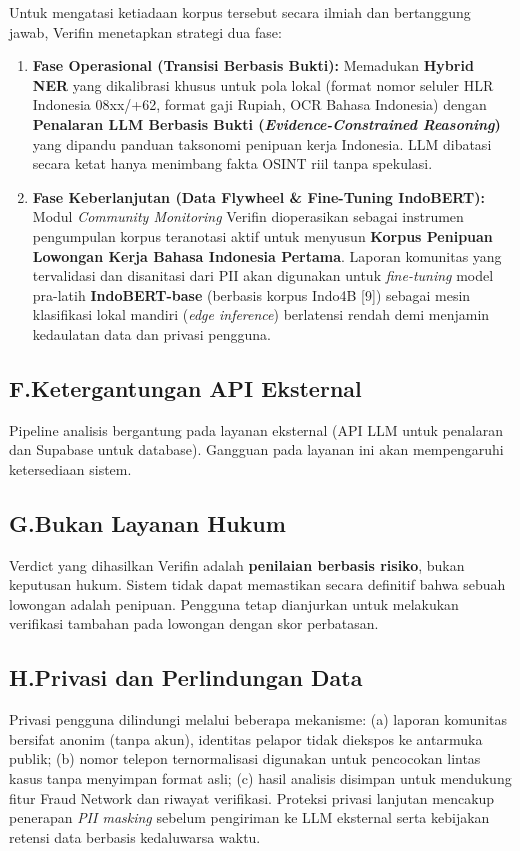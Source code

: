\documentclass[12pt,a4paper]{article}
\begin{document}
Untuk mengatasi ketiadaan korpus tersebut secara ilmiah dan bertanggung jawab, Verifin menetapkan strategi dua fase:
\begin{enumerate}[label=\textbf{\arabic*.}]
\item \textbf{Fase Operasional (Transisi Berbasis Bukti):} Memadukan \textbf{Hybrid NER} yang dikalibrasi
      khusus untuk pola lokal (format nomor seluler HLR Indonesia 08xx/+62, format gaji Rupiah, OCR Bahasa Indonesia)
      dengan \textbf{Penalaran LLM Berbasis Bukti (\textit{Evidence-Constrained Reasoning})} yang dipandu
      panduan taksonomi penipuan kerja Indonesia. LLM dibatasi secara ketat hanya menimbang fakta OSINT riil tanpa spekulasi.
\item \textbf{Fase Keberlanjutan (Data Flywheel \& Fine-Tuning IndoBERT):} Modul \textit{Community Monitoring}
      Verifin dioperasikan sebagai instrumen pengumpulan korpus teranotasi aktif untuk menyusun
      \textbf{Korpus Penipuan Lowongan Kerja Bahasa Indonesia Pertama}. Laporan komunitas yang tervalidasi dan
      disanitasi dari PII akan digunakan untuk \textit{fine-tuning} model pra-latih \textbf{IndoBERT-base}
      (berbasis korpus Indo4B [9]) sebagai mesin klasifikasi lokal mandiri (\textit{edge inference}) berlatensi
      rendah demi menjamin kedaulatan data dan privasi pengguna.
\end{enumerate}

\subsection*{F.\quad Ketergantungan API Eksternal}
Pipeline analisis bergantung pada layanan eksternal (API LLM untuk penalaran dan Supabase
untuk database). Gangguan pada layanan ini akan mempengaruhi ketersediaan sistem.

\subsection*{G.\quad Bukan Layanan Hukum}
Verdict yang dihasilkan Verifin adalah \textbf{penilaian berbasis risiko}, bukan keputusan
hukum. Sistem tidak dapat memastikan secara definitif bahwa sebuah lowongan adalah penipuan.
Pengguna tetap dianjurkan untuk melakukan verifikasi tambahan pada lowongan dengan skor
perbatasan.

\subsection*{H.\quad Privasi dan Perlindungan Data}
Privasi pengguna dilindungi melalui beberapa mekanisme: (a) laporan komunitas bersifat anonim
(tanpa akun), identitas pelapor tidak diekspos ke antarmuka publik; (b) nomor telepon
ternormalisasi digunakan untuk pencocokan lintas kasus tanpa menyimpan format asli; (c) hasil
analisis disimpan untuk mendukung fitur Fraud Network dan riwayat verifikasi. Proteksi privasi
lanjutan mencakup penerapan \textit{PII masking} sebelum pengiriman ke LLM eksternal serta
kebijakan retensi data berbasis kedaluwarsa waktu.
\end{document}
